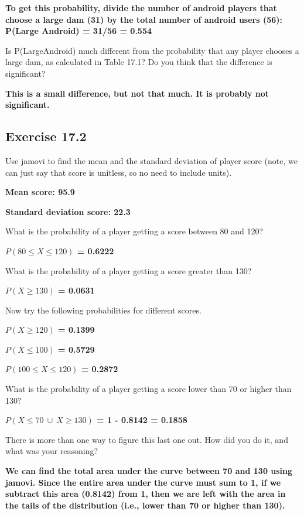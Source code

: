 \documentclass[
  openany]{krantz}
\begin{document}
\textbf{To get this probability, divide the number of android players that choose a large dam (31) by the total number of android users (56): P(Large \textbar{} Android) = 31/56 = 0.554}

Is P(Large\textbar Android) much different from the probability that any player chooses a large dam, as calculated in Table 17.1? Do you think that the difference is significant?

\textbf{This is a small difference, but not that much. It is probably not significant.}

\hypertarget{exercise-17.2}{%
\subsection{Exercise 17.2}\label{exercise-17.2}}

Use jamovi to find the mean and the standard deviation of player score (note, we can just say that score is unitless, so no need to include units).

\textbf{Mean score: 95.9}

\textbf{Standard deviation score: 22.3}

What is the probability of a player getting a score between 80 and 120?

\textbf{\(P(80 \leq X \leq 120)\) = 0.6222}

What is the probability of a player getting a score greater than 130?

\textbf{\(P(X \geq 130)\) = 0.0631}

Now try the following probabilities for different scores.

\textbf{\(P(X \geq 120)\) = 0.1399}

\textbf{\(P(X \leq 100)\) = 0.5729}

\textbf{\(P(100 \leq X \leq 120)\) = 0.2872}

What is the probability of a player getting a score lower than 70 or higher than 130?

\textbf{\(P(X \leq 70 \: \cup \: X \geq 130)\) = 1 - 0.8142 = 0.1858}

There is more than one way to figure this last one out. How did you do it, and what was your reasoning?

\textbf{We can find the total area under the curve between 70 and 130 using jamovi. Since the entire area under the curve must sum to 1, if we subtract this area (0.8142) from 1, then we are left with the area in the tails of the distribution (i.e., lower than 70 or higher than 130).}
\end{document}
